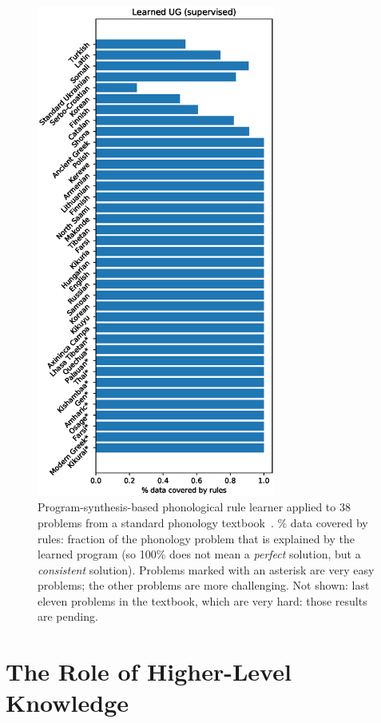\documentclass[12pt]{article}
\begin{document}
\begin{figure}
\centering\vspace{-3cm}  \includegraphics[width = 0.7\textwidth]{figures/languageComparison.eps}
  \caption{Program-synthesis-based phonological rule learner applied to 38 problems from a standard phonology textbook~\cite{9780511808869}. \% data covered by rules: fraction of the phonology problem that is explained by the learned program (so 100\% does not mean a \emph{perfect} solution, but a \emph{consistent} solution). Problems marked with an asterisk are very easy problems; the other problems are more challenging. Not shown: last eleven problems in the textbook, which are very hard: those results are pending.}\label{languageComparison}
\end{figure}

\section*{The Role of Higher-Level Knowledge}
\end{document}
